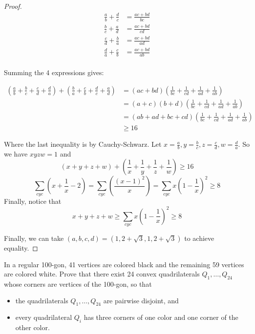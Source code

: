\documentclass{article}
\theoremstyle{mytheoremstyle}
\theoremstyle{mytheoremstyle}
\theoremstyle{myproblemstyle}
\begin{document}
    \begin{proof}
        \begin{align*}
            \frac{a}{b} + \frac{d}{c} &= \frac{ac + bd}{bc}\\
            \frac{b}{c} + \frac{a}{d} &= \frac{ac + bd}{cd}\\
            \frac{c}{d} + \frac{b}{a} &= \frac{ac + bd}{ad}\\
            \frac{d}{a} + \frac{c}{b} &= \frac{ac + bd}{ab}\\
        \end{align*}

        Summing the 4 expressions gives:

        \begin{align*}
            \left(\frac{a}{b}+\frac{b}{c}+\frac{c}{d}+\frac{d}{a}\right) + \left(\frac{b}{a}+\frac{c}{b}+\frac{d}{c}+\frac{a}{d}\right) &= (ac + bd)\left(\frac{1}{bc} + \frac{1}{cd} + \frac{1}{ad} + \frac{1}{ab}\right)\\
            &= (a+c)(b+d)\left(\frac{1}{bc} + \frac{1}{cd} + \frac{1}{ad} + \frac{1}{ab}\right)\\
            &= (ab + ad + bc + cd)\left(\frac{1}{bc} + \frac{1}{cd} + \frac{1}{ad} + \frac{1}{ab}\right)\\
            &\geq 16
        \end{align*}

        Where the last inequality is by Cauchy-Schwarz. Let $x = \frac{a}{b}, y = \frac{b}{c}, z = \frac{c}{d}, w = \frac{d}{a}$. So we have $xyzw = 1$ and
        \[(x + y + z + w) + \left(\frac{1}{x} + \frac{1}{y} + \frac{1}{z} + \frac{1}{w}\right) \geq 16\]
        \[\displaystyle\sum_{cyc}\left(x + \frac{1}{x} - 2\right) = \displaystyle\sum_{cyc}\left(\frac{{(x-1)}^2}{x}\right) = \displaystyle\sum_{cyc}x\left(1 - \frac{1}{x}\right)^2 \geq 8\]
        Finally, notice that 
        \[x + y + z + w \geq \displaystyle\sum_{cyc}x\left(1 - \frac{1}{x}\right)^2 \geq 8\]

        Finally, we can take $(a, b, c, d) = (1, 2 + \sqrt{3}, 1, 2+\sqrt{3})$ to achieve equality.
        
    \end{proof}

    \begin{problem}[2020 C2]
        In a regular 100-gon, 41 vertices are colored black and the remaining 59 vertices are colored white. Prove that there exist 24 convex quadrilaterals $Q_1, \ldots, Q_{24}$ whose corners are vertices of the 100-gon, so that
        \begin{itemize}
        \item the quadrilaterals $Q_1, \ldots, Q_{24}$ are pairwise disjoint, and
        \item every quadrilateral $Q_i$ has three corners of one color and one corner of the other color.
        \end{itemize}
    \end{problem}
\end{document}
